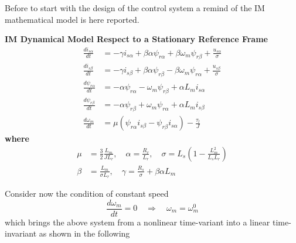 \documentclass[11pt,a4paper,oneside]{book}
\numberwithin{equation}{section}
\theoremstyle{it}
\theoremstyle{definition}
\begin{document}
Before to start with the design of the control system a remind of the IM 
mathematical model is here reported. 
\begin{mybox}
	\textbf{IM Dynamical Model Respect to a Stationary Reference Frame}
	\begin{equation}\label{im_control_problem_eq_1}
		\begin{aligned}
			\frac{di_{s\alpha}}{dt} &= -\gamma i_{s\alpha}  + 
			\beta\alpha\psi_{r\alpha}+\beta\omega_m\psi_{r\beta} + 
			\frac{u_{s\alpha}}{\sigma}\\[6pt]
			\frac{di_{s\beta}}{dt} &= -\gamma i_{s\beta}  + 
			\beta\alpha\psi_{r\beta}-\beta\omega_m\psi_{r\alpha} + 
			\frac{u_{s\beta}}{\sigma} \\[6pt]
			\frac{d\psi_{r\alpha}}{dt} &= -\alpha \psi_{r\alpha} 
			-\omega_m\psi_{r\beta}+\alpha L_m i_{s\alpha} \\[6pt]
			\frac{d\psi_{r\beta}}{dt} &= -\alpha \psi_{r\beta} 
			+\omega_m\psi_{r\alpha}+\alpha L_m i_{s\beta} \\[6pt]
			\frac{d\omega_m}{dt} &= \mu \left(\psi_{r\alpha}i_{s\beta} - 
			\psi_{r\beta}i_{s\alpha}\right)-\frac{\tau_l}{J}
		\end{aligned}
	\end{equation}
	\textbf{where}
	\begin{equation}\label{im_control_problem_eq_2}
		\begin{aligned}
			\mu & = \frac{3}{2}\frac{L_m}{JL_r}, \quad
			\alpha = \frac{R_r}{L_r},  \quad
			\sigma = L_s \left(1-\frac{L_m^2}{L_sL_r}\right) \\[6pt]
			\beta & = \frac{L_m}{\sigma L_r},  \quad
			\gamma = \frac{R_s}{\sigma} + \beta \alpha L_m
		\end{aligned}
	\end{equation}
\end{mybox}
Consider now the condition of constant speed
\begin{equation}\label{im_control_problem_eq_3}
	\frac{d\omega_m}{dt}=0 \quad\Rightarrow\quad\omega_m=\omega_m^0
\end{equation}
which brings the above system from a nonlinear time-variant into a linear 
time-invariant as shown in the following
\end{document}
